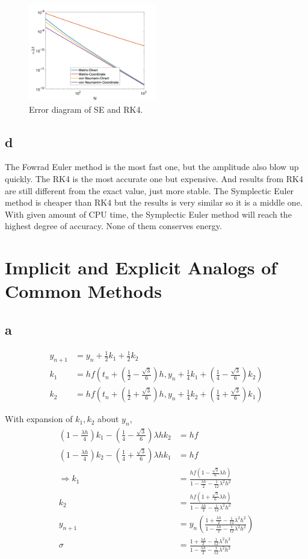 \documentclass[letterpaper,10pt]{article}
\begin{document}
\begin{figure}[h]
  \centering
  \includegraphics[width=0.5\textwidth]{p2_4.png}
  \caption{Error diagram of SE and RK4. }
  \label{fig2_4}
\end{figure}
\subsection{d}
The Fowrad Euler method is the most fast one, but the amplitude also blow up quickly. The RK4 is the most accurate one but expensive. And results from RK4 are still different from the exact value, just more stable. The Symplectic Euler method is cheaper than RK4 but the results is very similar so it is a middle one. With given amount of CPU time, the Symplectic Euler method will reach the highest degree of accuracy. None of them conserves energy. 
\section{Implicit and Explicit Analogs of Common Methods}
\subsection{a}
\begin{align*}
  y_{n+1}&=y_n+\frac{1}{2}k_1+\frac{1}{2}k_2\\
  k_1&=hf\left(t_n+\left(\frac{1}{2}-\frac{\sqrt{3}}{6}\right)h,y_n+\frac{1}{4}k_1+\left(\frac{1}{4}-\frac{\sqrt{3}}{6}\right)k_2\right)\\
  k_2&=hf\left(t_n+\left(\frac{1}{2}+\frac{\sqrt{3}}{6}\right)h,y_n+\frac{1}{4}k_2+\left(\frac{1}{4}+\frac{\sqrt{3}}{6}\right)k_1\right)
\end{align*}

With expansion of $k_1, k_2$ about $y_n$, 
\begin{align*}
  \left(1-\frac{\lambda h}{4}\right)k_1-\left(\frac{1}{4}-\frac{\sqrt{3}}{6}\right)\lambda hk_2&=hf\\
  \left(1-\frac{\lambda h}{4}\right)k_2-\left(\frac{1}{4}+\frac{\sqrt{3}}{6}\right)\lambda hk_1&=hf\\
  \Rightarrow k_1&=\frac{hf(1-\frac{\sqrt{3}}{6}\lambda h)}{1-\frac{\lambda h}{2}-\frac{1}{12}\lambda^2h^2}\\
  k_2&=\frac{hf(1+\frac{\sqrt{3}}{6}\lambda h)}{1-\frac{\lambda h}{2}-\frac{1}{12}\lambda^2h^2}\\
  y_{n+1}&=y_n\left(\frac{1+\frac{\lambda h}{2}-\frac{1}{12}\lambda^2 h^2}{1-\frac{\lambda h}{2}-\frac{1}{12}\lambda^2 h^2}\right)\\
  \sigma &=\frac{1+\frac{\lambda h}{2}-\frac{1}{12}\lambda^2 h^2}{1-\frac{\lambda h}{2}-\frac{1}{12}\lambda^2 h^2}
\end{align*}
\end{document}
